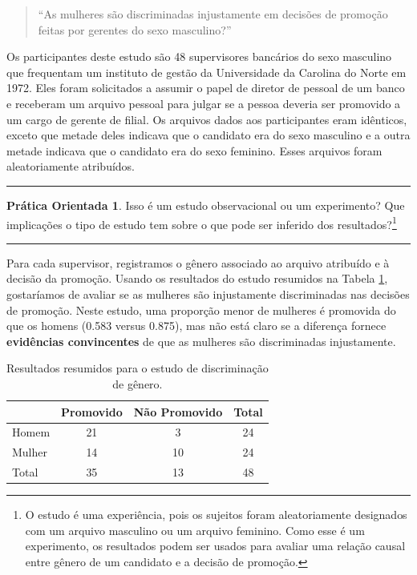\documentclass[
]{book}
\theoremstyle{definition}
\theoremstyle{definition}
\theoremstyle{definition}
\newtheorem{exercise}{Prática Orientada}[chapter]
\theoremstyle{definition}
\theoremstyle{remark}
\begin{document}
\begin{quote}
``As mulheres são discriminadas injustamente em decisões de promoção feitas por gerentes do sexo masculino?''
\end{quote}

Os participantes deste estudo são 48 supervisores bancários do sexo masculino que frequentam um instituto de gestão da Universidade da Carolina do Norte em 1972. Eles foram solicitados a assumir o papel de diretor de pessoal de um banco e receberam um arquivo pessoal para julgar se a pessoa deveria ser promovido a um cargo de gerente de filial. Os arquivos dados aos participantes eram idênticos, exceto que metade deles indicava que o candidato era do sexo masculino e a outra metade indicava que o candidato era do sexo feminino. Esses arquivos foram aleatoriamente atribuídos.

\begin{center}\rule{0.5\linewidth}{0.5pt}\end{center}

\begin{exercise}
\protect\hypertarget{exr:unnamed-chunk-41}{}{\label{exr:unnamed-chunk-41} }Isso é um estudo observacional ou um experimento? Que implicações o tipo de estudo tem sobre o que pode ser inferido dos resultados?\footnote{O estudo é uma experiência, pois os sujeitos foram aleatoriamente designados com um arquivo masculino ou um arquivo feminino. Como esse é um experimento, os resultados podem ser usados para avaliar uma relação causal entre gênero de um candidato e a decisão de promoção.}
\end{exercise}

\begin{center}\rule{0.5\linewidth}{0.5pt}\end{center}

Para cada supervisor, registramos o gênero associado ao arquivo atribuído e à decisão da promoção. Usando os resultados do estudo resumidos na Tabela \ref{tab:discriminationResults}, gostaríamos de avaliar se as mulheres são injustamente discriminadas nas decisões de promoção. Neste estudo, uma proporção menor de mulheres é promovida do que os homens (0.583 versus 0.875), mas não está claro se a diferença fornece \textbf{evidências convincentes} de que as mulheres são discriminadas injustamente.

\begin{table}

\caption{\label{tab:discriminationResults}Resultados resumidos para o estudo de discriminação de gênero.}
\centering
\begin{tabular}[t]{l|c|c|c}
\hline
  & Promovido & Não Promovido & Total\\
\hline
Homem & 21 & 3 & 24\\
\hline
Mulher & 14 & 10 & 24\\
\hline
Total & 35 & 13 & 48\\
\hline
\end{tabular}
\end{table}
\end{document}
